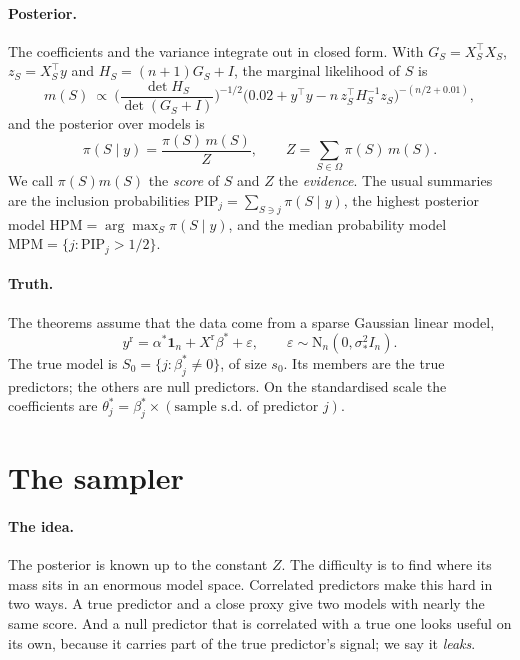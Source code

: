 \documentclass[11pt]{article}
\newcommand{\one}{\mathbf{1}}
\newcommand{\N}{\mathrm{N}}
\newcommand{\yr}{y^{\mathrm r}}
\newcommand{\Xr}{X^{\mathrm r}}
\newcommand{\bstar}{\beta^*}
\newcommand{\sigs}{\sigma_*}
\newcommand{\Sz}{S_0}
\newcommand{\sz}{s_0}
\newcommand{\Om}{\Omega}
\newcommand{\pis}[1]{\pi(#1\mid y)}
\newcommand{\PIP}{\mathrm{PIP}}
\newcommand{\HPM}{\mathrm{HPM}}
\newcommand{\MPM}{\mathrm{MPM}}
\theoremstyle{plain}
\theoremstyle{definition}
\begin{document}
\paragraph{Posterior.} The coefficients and the variance integrate out in closed form. With $G_S=X_S^\top X_S$,
$z_S=X_S^\top y$ and $H_S=(n+1)G_S+I$, the marginal likelihood of $S$ is
\[
  m(S)\ \propto\ \Big(\frac{\det H_S}{\det(G_S+I)}\Big)^{-1/2}\big(0.02+y^\top y-n\,z_S^\top H_S^{-1}z_S\big)^{-(n/2+0.01)},
\]
and the posterior over models is
\[
  \pis{S}=\frac{\pi(S)\,m(S)}{Z},\qquad Z=\sum_{S\in\Om}\pi(S)\,m(S).
\]
We call $\pi(S)m(S)$ the \emph{score} of $S$ and $Z$ the \emph{evidence}. The usual summaries are the inclusion
probabilities $\PIP_j=\sum_{S\ni j}\pis{S}$, the highest posterior model $\HPM=\arg\max_S\pis{S}$, and the median
probability model $\MPM=\{j:\PIP_j>1/2\}$.

\paragraph{Truth.} The theorems assume that the data come from a sparse Gaussian linear model,
\begin{equation}\label{eq:model}
  \yr=\alpha^*\one_n+\Xr\bstar+\varepsilon,\qquad \varepsilon\sim\N_n(0,\sigs^2I_n).
\end{equation}
The true model is $\Sz=\{j:\beta^*_j\neq0\}$, of size $\sz$. Its members are the true predictors; the others are null
predictors. On the standardised scale the coefficients are $\theta^*_j=\beta^*_j\times(\text{sample s.d.\ of predictor }j)$.

\section{The sampler}

\paragraph{The idea.} The posterior is known up to the constant $Z$. The difficulty is to find where its mass sits in an
enormous model space. Correlated predictors make this hard in two ways. A true predictor and a close proxy give two
models with nearly the same score. And a null predictor that is correlated with a true one looks useful on its own,
because it carries part of the true predictor's signal; we say it \emph{leaks}.
\end{document}
